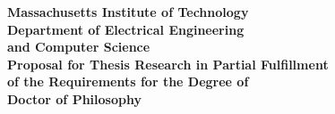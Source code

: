 \documentclass[twoside]{article}
\begin{document}
\pagestyle{empty}
\def\title{Performance Engineering of Proof-Based Software Systems}
\def\author{Jason Gross}
\def\addrone{258 Prospect St, \#1L}
\def\addrtwo{Cambridge, MA 02139}

\def\degree{Doctor of Philosophy}
\def\deptname{Electrical Engineering \\ and Computer Science}
\def\laboratory{Computer Science and Artificial Intelligence Laboratory}

\def\submissiondate{\proposaldate}
\def\completiondate{May 2020}

\def\supervisor{Professor Adam Chlipala}
\def\supertitleone{Associate Professor of Computer Science}
\def\supertitletwo{}%

\def\readerone{Professor Nickolai Zeldovich}
\def\readeronetitleone{Professor of Electrical Engineering}
\def\readeronetitletwo{and Computer Science}

\def\readertwo{Professor Saman Amarasinghe}
\def\readertwotitleone{Professor of Electrical Engineering}
\def\readertwotitletwo{and Computer Science}



\def\abstract{}



\begin{center}
{\Large \bf
   Massachusetts Institute of Technology
\\ Department of \deptname \\}
\vspace{.25in}
{\Large \bf
   Proposal for Thesis Research in Partial Fulfillment
\\ of the Requirements for the Degree of
\\ \degree \\}
\end{center}
\end{document}
